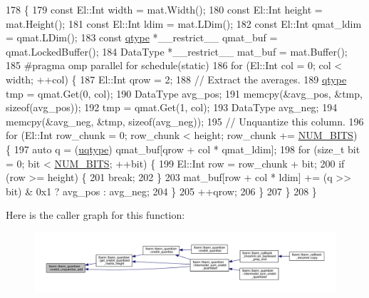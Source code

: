 \begin{DoxyCode}
178               \{
179   \textcolor{keyword}{const} El::Int width = mat.Width();
180   \textcolor{keyword}{const} El::Int height = mat.Height();
181   \textcolor{keyword}{const} El::Int ldim = mat.LDim();
182   \textcolor{keyword}{const} El::Int qmat\_ldim = qmat.LDim();
183   \textcolor{keyword}{const} \hyperlink{classlbann_1_1lbann__quantizer_afcda642ff1b44d31eec910909c3d013e}{qtype} *\_\_restrict\_\_ qmat\_buf = qmat.LockedBuffer();
184   DataType *\_\_restrict\_\_ mat\_buf = mat.Buffer();
185 \textcolor{preprocessor}{  #pragma omp parallel for schedule(static)}
186   \textcolor{keywordflow}{for} (El::Int col = 0; col < width; ++col) \{
187     El::Int qrow = 2;
188     \textcolor{comment}{// Extract the averages.}
189     \hyperlink{classlbann_1_1lbann__quantizer_afcda642ff1b44d31eec910909c3d013e}{qtype} tmp = qmat.Get(0, col);
190     DataType avg\_pos;
191     memcpy(&avg\_pos, &tmp, \textcolor{keyword}{sizeof}(avg\_pos));
192     tmp = qmat.Get(1, col);
193     DataType avg\_neg;
194     memcpy(&avg\_neg, &tmp, \textcolor{keyword}{sizeof}(avg\_neg));
195     \textcolor{comment}{// Unquantize this column.}
196     \textcolor{keywordflow}{for} (El::Int row\_chunk = 0; row\_chunk < height; row\_chunk += \hyperlink{classlbann_1_1lbann__quantizer_a33ea17392f53b90e91aea1ffb7e11d68}{NUM\_BITS}) \{
197       \textcolor{keyword}{auto} q = (\hyperlink{classlbann_1_1lbann__quantizer_ac8b63c86fc871e248ce20c7af19a7fad}{uqtype}) qmat\_buf[qrow + col * qmat\_ldim];
198       \textcolor{keywordflow}{for} (\textcolor{keywordtype}{size\_t} bit = 0; bit < \hyperlink{classlbann_1_1lbann__quantizer_a33ea17392f53b90e91aea1ffb7e11d68}{NUM\_BITS}; ++bit) \{
199         El::Int row = row\_chunk + bit;
200         \textcolor{keywordflow}{if} (row >= height) \{
201           \textcolor{keywordflow}{break};
202         \}
203         mat\_buf[row + col * ldim] += (q >> bit) & 0x1 ? avg\_pos : avg\_neg;
204       \}
205       ++qrow;
206     \}
207   \}
208 \}
\end{DoxyCode}
Here is the caller graph for this function\+:\nopagebreak
\begin{figure}[H]
\begin{center}
\leavevmode
\includegraphics[width=350pt]{classlbann_1_1lbann__quantizer_a879cea8464408b8265be9e55edd83b2c_icgraph}
\end{center}
\end{figure}
\mbox{\label{classlbann_1_1lbann__quantizer_aa5aabc1cb4163e95aee993d9b37b9b32}} 
